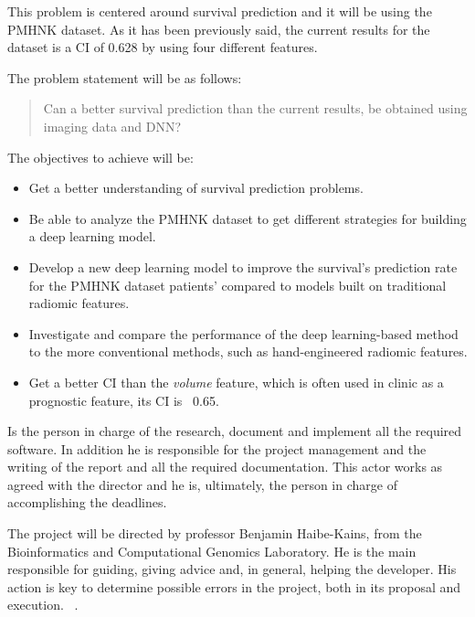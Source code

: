 
This problem is centered around survival prediction and it will be using the \gls{PMHNK} dataset. 
As it has been previously said, the current results for the dataset is a \gls{CI}
of 0.628 \cite{medical:ct-based-radiomic-signature} by using four different features.

The problem statement will be as follows:
\begin{quotation}
  Can a better survival prediction than the current results, be obtained using imaging data and
  \gls{DNN}?
\end{quotation}


The objectives to achieve will be:
\begin{itemize}
  \item Get a better understanding of survival prediction problems.
  \item Be able to analyze the \gls{PMHNK} dataset to get different strategies for building a 
  deep learning model.
  \item Develop a new deep learning model to improve the survival's prediction rate for the
  \gls{PMHNK} dataset patients' compared to models built on traditional radiomic features.
  \item Investigate and compare the performance of the deep learning-based method to 
  the more conventional methods, such as hand-engineered radiomic features.
  \item Get a better \gls{CI} than the \emph{volume} feature, which is often used in clinic as a
  prognostic feature, its \gls{CI} is ~0.65.
\end{itemize}


Is the person in charge of the research, document and implement all the required software.
In addition he is responsible for the project management and the writing of the report
and all the required documentation. This actor works as agreed with the director and
he is, ultimately, the person in charge of accomplishing the deadlines.

The project will be directed by professor Benjamin Haibe-Kains, from the Bioinformatics 
and Computational Genomics Laboratory. He is the main responsible for guiding, giving 
advice and, in general, helping the developer.
His action is key to determine possible errors in the project, both in its proposal and 
execution.
~\cites{bhklab}.

